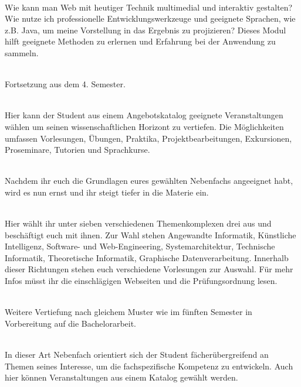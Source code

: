 \textbf{} \\
Wie kann man Web mit heutiger Technik multimedial und interaktiv gestalten?
Wie nutze ich professionelle Entwicklungswerkzeuge und geeignete Sprachen, wie z.B. Java, um meine Vorstellung in das Ergebnis zu projizieren?
Dieses Modul hilft geeignete Methoden zu erlernen und Erfahrung bei der Anwendung zu sammeln.

\textbf{} \\
Fortsetzung aus dem 4. Semester.

\textbf{} \\
Hier kann der Student aus einem Angebotskatalog geeignete Veranstaltungen wählen um seinen wissenschaftlichen Horizont zu vertiefen.
Die Möglichkeiten umfassen Vorlesungen, Übungen, Praktika, Projektbearbeitungen, Exkursionen, Proseminare, Tutorien und Sprachkurse.

\textbf{} \\
Nachdem ihr euch die Grundlagen eures gewählten Nebenfachs angeeignet habt, wird es nun ernst und ihr steigt tiefer in die Materie ein.

\textbf{} \\
Hier wählt ihr unter sieben verschiedenen Themenkomplexen drei aus und beschäftigt euch mit ihnen.
Zur Wahl stehen Angewandte Informatik, Künstliche Intelligenz, Software- und Web-Engineering, Systemarchitektur, Technische Informatik, Theoretische Informatik, Graphische Datenverarbeitung.
Innerhalb dieser Richtungen stehen euch verschiedene Vorlesungen zur Auswahl.
Für mehr Infos müsst ihr die einschlägigen Webseiten und die Prüfungsordnung lesen.


\textbf{} \\
Weitere Vertiefung nach gleichem Muster wie im fünften Semester in Vorbereitung auf die Bachelorarbeit.

\textbf{} \\
In dieser Art Nebenfach orientiert sich der Student fächerübergreifend an Themen seines Interesse, um die fachspezifische Kompetenz zu entwickeln.
Auch hier können Veranstaltungen aus einem Katalog gewählt werden.


